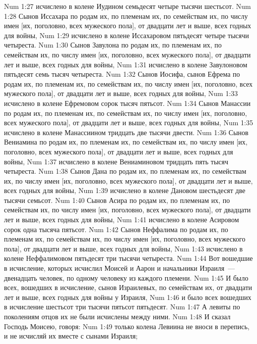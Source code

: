 \vs Num 1:27 исчислено в колене Иудином семьдесят четыре тысячи шестьсот.
\vs Num 1:28 Сынов Иссахара по родам их, по племенам их, по семействам их, по числу имен [их, поголовно, всех мужеского пола], от двадцати лет и выше, всех годных для войны,
\vs Num 1:29 исчислено в колене Иссахаровом пятьдесят четыре тысячи четыреста.
\vs Num 1:30 Сынов Завулона по родам их, по племенам их, по семействам их, по числу имен [их, поголовно, всех мужеского пола], от двадцати лет и выше, всех годных для войны,
\vs Num 1:31 исчислено в колене Завулоновом пятьдесят семь тысяч четыреста.
\vs Num 1:32 Сынов Иосифа, сынов Ефрема по родам их, по племенам их, по семействам их, по числу имен [их, поголовно, всех мужеского пола], от двадцати лет и выше, всех годных для войны,
\vs Num 1:33 исчислено в колене Ефремовом сорок тысяч пятьсот.
\vs Num 1:34 Сынов Манассии по родам их, по племенам их, по семействам их, по числу имен [их, поголовно, всех мужеского пола], от двадцати лет и выше, всех годных для войны,
\vs Num 1:35 исчислено в колене Манассиином тридцать две тысячи двести.
\vs Num 1:36 Сынов Вениамина по родам их, по племенам их, по семействам их, по числу имен [их, поголовно, всех мужеского пола], от двадцати лет и выше, всех годных для войны,
\vs Num 1:37 исчислено в колене Вениаминовом тридцать пять тысяч четыреста.
\vs Num 1:38 Сынов Дана по родам их, по племенам их, по семействам их, по числу имен [их, поголовно, всех мужеского пола], от двадцати лет и выше, всех годных для войны,
\vs Num 1:39 исчислено в колене Дановом шестьдесят две тысячи семьсот.
\vs Num 1:40 Сынов Асира по родам их, по племенам их, по семействам их, по числу имен [их, поголовно, всех мужеского пола], от двадцати лет и выше, всех годных для войны,
\vs Num 1:41 исчислено в колене Асировом сорок одна тысяча пятьсот.
\vs Num 1:42 Сынов Неффалима по родам их, по племенам их, по семействам их, по числу имен [их, поголовно, всех мужеского пола], от двадцати лет и выше, всех годных для войны,
\vs Num 1:43 исчислено в колене Неффалимовом пятьдесят три тысячи четыреста.
\vs Num 1:44 Вот вошедшие в исчисление, которых исчислил Моисей и Аарон и начальники Израиля~--- двенадцать человек, по одному человеку из каждого племени.
\vs Num 1:45 И было всех, вошедших в исчисление, сынов Израилевых, по семействам их, от двадцати лет и выше, всех годных для войны у Израиля,
\vs Num 1:46 и было всех вошедших в исчисление шестьсот три тысячи пятьсот пятьдесят.
\vs Num 1:47 А левиты по поколениям отцов их не были исчислены между ними.
\rsbpar\vs Num 1:48 И сказал Господь Моисею, говоря:
\vs Num 1:49 только колена Левиина не вноси в перепись, и не исчисляй их вместе с сынами Израиля;
